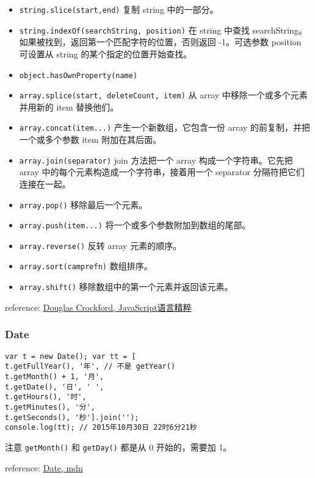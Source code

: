\begin{itemize}
\tightlist
\item
  \texttt{string.slice(start,end)} 复制 string 中的一部分。
\item
  \texttt{string.indexOf(searchString,\ position)} 在 string 中查找
  searchString。如果被找到，返回第一个匹配字符的位置，否则返回
  -1。可选参数 position 可设置从 string 的某个指定的位置开始查找。
\item
  \texttt{object.hasOwnProperty(name)}
\item
  \texttt{array.splice(start,\ deleteCount,\ item)} 从 array
  中移除一个或多个元素并用新的 item 替换他们。
\item
  \texttt{array.concat(item...)} 产生一个新数组，它包含一份 array
  的前复制，并把一个或多个参数 item 附加在其后面。
\item
  \texttt{array.join(separator)} join 方法把一个 array
  构成一个字符串。它先把 array 中的每个元素构造成一个字符串，接着用一个
  separator 分隔符把它们连接在一起。
\item
  \texttt{array.pop()} 移除最后一个元素。
\item
  \texttt{array.push(item...)} 将一个或多个参数附加到数组的尾部。
\item
  \texttt{array.reverse()} 反转 array 元素的顺序。
\item
  \texttt{array.sort(camprefn)} 数组排序。
\item
  \texttt{array.shift()} 移除数组中的第一个元素并返回该元素。
\end{itemize}

reference: \href{http://book.douban.com/subject/11874748/}{Douglas
Crockford, JavaScript语言精粹}

\subsubsection{Date}\label{date}

\begin{verbatim}
var t = new Date(); var tt = [
t.getFullYear(), '年', // 不是 getYear() 
t.getMonth() + 1, '月',
t.getDate(), '日', ' ', 
t.getHours(), '时', 
t.getMinutes(), '分',
t.getSeconds(), '秒'].join(''); 
console.log(tt); // 2015年10月30日 22时6分21秒 
\end{verbatim}

注意 \texttt{getMonth()} 和 \texttt{getDay()} 都是从 0 开始的，需要加
1。

reference: \href{https://developer.mozilla.org/en-US/docs/Web/JavaScript/Reference/Global_Objects/Date}{Date,
mdn}

